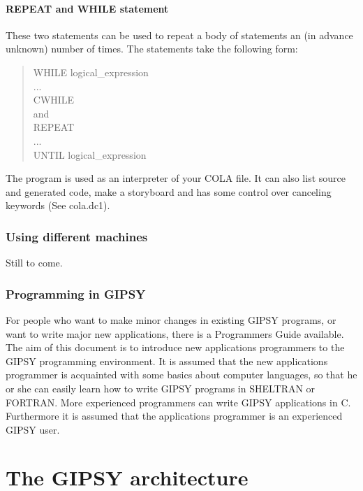 \subsection*{REPEAT and WHILE statement}

These two statements can be used to repeat a body of statements
an (in advance unknown) number of times.
The statements take the following form:

\begin{verse}
              WHILE logical\_expression\\
                 ...\\
              CWHILE\\

              and\\

              REPEAT\\
                 ...\\
              UNTIL logical\_expression\\
\end{verse}

The program  is used as an interpreter of your COLA file.
It can also list source and generated code, make a storyboard and has
some control over canceling keywords (See cola.dc1).


\section{Using different machines}
Still to come.

\section{Programming in GIPSY}
For people who want to make  minor changes in existing GIPSY
programs, or want to write major new applications, there is  a 
Programmers Guide available. 
The aim of this document is to introduce new applications programmers to
the GIPSY programming environment.  It is assumed that the new
applications programmer is acquainted with some basics about computer
languages, so that he or she can easily learn how to write GIPSY
programs in SHELTRAN or FORTRAN.  More experienced programmers can write
GIPSY applications in C.  Furthermore it is assumed that the
applications programmer is an experienced GIPSY user.



\part{The GIPSY architecture\label{part:GIPSYArch}}


